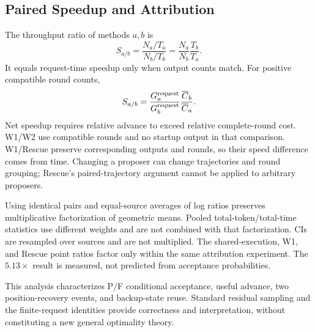 \subsection{Paired Speedup and Attribution}
\label{app:ratios}
The throughput ratio of methods $a,b$ is
\begin{equation}
S_{a/b}=\frac{N_a/T_a}{N_b/T_b}
=\frac{N_a}{N_b}\frac{T_b}{T_a}.
\end{equation}
It equals request-time speedup only when output counts match. For positive compatible round counts,
\begin{equation}
S_{a/b}=\frac{G_a^{\rm request}}{G_b^{\rm request}}
\frac{\overline C_b}{\overline C_a}.
\end{equation}
Net speedup requires relative advance to exceed relative complete-round cost. W1/W2 use compatible rounds and no startup output in that comparison. W1/Rescue preserve corresponding outputs and rounds, so their speed difference comes from time. Changing a proposer can change trajectories and round grouping; Rescue's paired-trajectory argument cannot be applied to arbitrary proposers.

Using identical pairs and equal-source averages of log ratios preserves multiplicative factorization of geometric means. Pooled total-token/total-time statistics use different weights and are not combined with that factorization. CIs are resampled over sources and are not multiplied. The shared-execution, W1, and Rescue point ratios factor only within the same attribution experiment. The $5.13\times$ result is measured, not predicted from acceptance probabilities.

This analysis characterizes P/F conditional acceptance, useful advance, two position-recovery events, and backup-state reuse. Standard residual sampling and the finite-request identities provide correctness and interpretation, without constituting a new general optimality theory.
